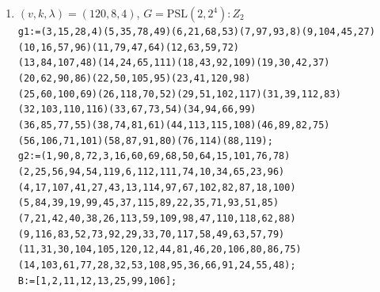 \documentclass[a4paper,twopage,reqno,12pt]{amsart}
\theoremstyle{definition}
\numberwithin{equation}{section}
\newcommand{\PSL}{\mathrm{PSL}}
\newcommand{\Aut}{\mathrm{Aut}}
\begin{document}
\begin{enumerate}
    \item\label{12084_1} $(v,k,\lambda)=(120,8,4)$, $G=\PSL(2,2^4):Z_2$\\
    {\tiny \texttt{g1:=(3,15,28,4)(5,35,78,49)(6,21,68,53)(7,97,93,8)(9,104,45,27)(10,16,57,96)(11,79,47,64)(12,63,59,72)\\
    (13,84,107,48)(14,24,65,111)(18,43,92,109)(19,30,42,37)(20,62,90,86)(22,50,105,95)(23,41,120,98)\\
    (25,60,100,69)(26,118,70,52)(29,51,102,117)(31,39,112,83)(32,103,110,116)(33,67,73,54)(34,94,66,99)\\
    (36,85,77,55)(38,74,81,61)(44,113,115,108)(46,89,82,75)(56,106,71,101)(58,87,91,80)(76,114)(88,119);}\\
    \texttt{g2:=(1,90,8,72,3,16,60,69,68,50,64,15,101,76,78)(2,25,56,94,54,119,6,112,111,74,10,34,65,23,96)\\(4,17,107,41,27,43,13,114,97,67,102,82,87,18,100)(5,84,39,19,99,45,37,115,89,22,35,71,93,51,85)\\
    (7,21,42,40,38,26,113,59,109,98,47,110,118,62,88)(9,116,83,52,73,92,29,33,70,117,58,49,63,57,79)\\
    (11,31,30,104,105,120,12,44,81,46,20,106,80,86,75)(14,103,61,77,28,32,53,108,95,36,66,91,24,55,48);}\\}
    \texttt{B:=[1,2,11,12,13,25,99,106];}\\


\end{enumerate}
\end{document}
